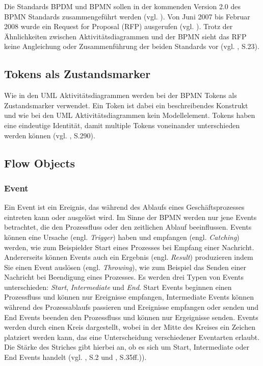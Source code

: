 Die Standards BPDM und BPMN sollen in der kommenden Version 2.0 des BPMN Standards zusammengeführt werden (vgl. \citep{Gilbert2007}). Von Juni 2007 bis Februar 2008 wurde ein Request for Proposal (RFP) ausgerufen (vgl. \citep{BPMN2007}). Trotz der Ähnlichkeiten zwischen Aktivitätsdiagrammen und der BPMN sieht das RFP keine Angleichung oder Zusammenführung der beiden Standards vor (vgl. \citep{BPMN2007}, S.23).

\subsection{Tokens als Zustandsmarker}
Wie in den UML Aktivitätsdiagrammen werden bei der BPMN Tokens als Zustandsmarker verwendet. Ein Token ist dabei ein beschreibendes Konstrukt und wie bei den UML Aktivitätsdiagrammen kein Modellelement. Tokens haben eine eindeutige Identität, damit multiple Tokens voneinander unterschieden werden können (vgl. \citep{BPMN2009}, S.290).

\subsection{Flow Objects}

\subsubsection{Event}
Ein Event ist ein Ereignis, das während des Ablaufs eines Geschäftsprozesses eintreten kann oder ausgelöst wird. Im Sinne der BPMN werden nur jene Events betrachtet, die den Prozessfluss oder den zeitlichen Ablauf beeinflussen. Events können eine Ursache (engl. \emph{Trigger}) haben und empfangen (engl. \emph{Catching}) werden, wie zum Beispielder Start eines Prozesses bei Empfang einer Nachricht. Andererseits können Events auch ein Ergebnis (engl. \emph{Result}) produzieren indem Sie einen Event auslösen (engl. \emph{Throwing}), wie zum Beispiel das Senden einer Nachricht bei Beendigung eines Prozesses. Es werden drei Typen von Events unterschieden: \emph{Start}, \emph{Intermediate} und \emph{End}. Start Events beginnen einen Prozessfluss und können nur Ereignisse empfangen, Intermediate Events können während des Prozessablaufs passieren und Ereignisse empfangen oder senden und End Events beenden den Prozessfluss und können nur Ergeignisse senden. Events werden durch einen Kreis dargestellt, wobei in der Mitte des Kreises ein Zeichen platziert werden kann, das eine Unterscheidung verschiedener Eventarten erlaubt. Die Stärke des Striches gibt hierbei an, ob es sich um Start, Intermediate oder End Events handelt (vgl. \citep{White2004}, S.2 und \citep{BPMN2009}, S.35ff.)).

